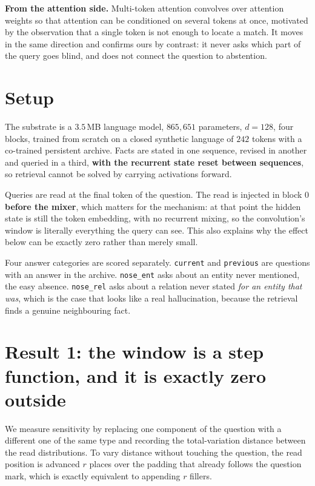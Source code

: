 \documentclass[10pt]{article}
\begin{document}
\textbf{From the attention side.} Multi-token attention \citep{mta} convolves over attention weights so
that attention can be conditioned on several tokens at once, motivated by the observation that a single
token is not enough to locate a match. It moves in the same direction and confirms ours by contrast: it
never asks which part of the query goes blind, and does not connect the question to abstention.

\section{Setup}

The substrate is a $3.5$\,MB language model, $865{,}651$ parameters, $d=128$, four blocks, trained from
scratch on a closed synthetic language of $242$ tokens with a co-trained persistent archive. Facts are
stated in one sequence, revised in another and queried in a third, \textbf{with the recurrent state
reset between sequences}, so retrieval cannot be solved by carrying activations forward.

Queries are read at the final token of the question. The read is injected in block $0$
\textbf{before the mixer}, which matters for the mechanism: at that point the hidden state is still the
token embedding, with no recurrent mixing, so the convolution's window is literally everything the
query can see. This also explains why the effect below can be exactly zero rather than merely small.

Four answer categories are scored separately. \texttt{current} and \texttt{previous} are questions with
an answer in the archive. \texttt{nose\_ent} asks about an entity never mentioned, the easy absence.
\texttt{nose\_rel} asks about a relation never stated \emph{for an entity that was}, which is the case
that looks like a real hallucination, because the retrieval finds a genuine neighbouring fact.

\section{Result 1: the window is a step function, and it is exactly zero outside}

We measure sensitivity by replacing one component of the question with a different one of the same
type and recording the total-variation distance between the read distributions. To vary distance
without touching the question, the read position is advanced $r$ places over the padding that already
follows the question mark, which is exactly equivalent to appending $r$ fillers.
\end{document}

